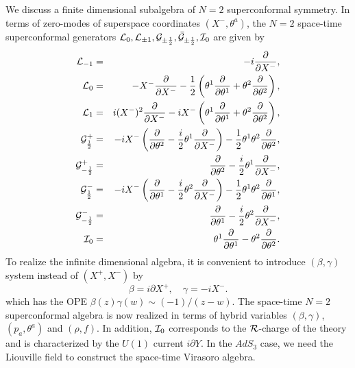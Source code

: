 \documentclass[a4paper,12pt]{article}
\begin{document}
We discuss a finite dimensional subalgebra of $N=2$
superconformal symmetry.
In terms of zero-modes of superspace coordinates $(X^{-},\theta^a)$, the 
$N=2$ space-time superconformal generators 
${\cal L}_{0},{\cal L}_{\pm1},{\cal G}_{\pm{1\over2}},
\bar{\cal G}_{\pm{1\over2}},{\cal I}_{0}$ are given by
\begin{eqnarray}
 {\cal L}_{-1}&=&-i{\partial\over\partial X^{-}},\nonumber\\
{\cal L}_{0}&=&-X^{-}{\partial\over\partial X^{-}}
-{1\over2}\left(\theta^{1}{\partial\over\partial \theta^{1}}+
\theta^{2}{\partial\over\partial \theta^{2}}\right),\nonumber\\
{\cal L}_{1}&=&i(X^{-})^2{\partial\over\partial X^{-}}
-iX^{-}\left(\theta^{1}{\partial\over\partial \theta^{1}}+
\theta^{2}{\partial\over\partial \theta^{2}}\right),\nonumber\\
{\cal G}_{{1\over2}}^{+}&=&
-i X^{-}\left(
{\partial\over\partial \theta^{2}}
-{i\over2}\theta^{1}{\partial\over\partial X^{-}}\right)
-{1\over 2}\theta^{1}\theta^{2}{\partial\over\partial \theta^{2}},
\nonumber\\
{\cal G}_{-{1\over2}}^{+}&=&
{\partial\over\partial \theta^{2}}
-{i\over2}\theta^{1}{\partial\over\partial X^{-}},\nonumber\\
{\cal G}_{{1\over2}}^{-}&=&
-i X^{-}\left(
{\partial\over\partial \theta^{1}}
-{i\over2}\theta^{2}{\partial\over\partial X^{-}}\right)
-{1\over 2}\theta^{1}\theta^{2}{\partial\over\partial \theta^{1}},
\nonumber\\
{\cal G}_{-{1\over2}}^{-}&=&
{\partial\over\partial \theta^{1}}
-{i\over2}\theta^{2}{\partial\over\partial X^{-}},
\nonumber\\
{\cal I}_{0}&=&
\theta^{1}{\partial\over\partial \theta^{1}}-
\theta^{2}{\partial\over\partial \theta^{2}}.
\end{eqnarray}
To realize the infinite dimensional algebra, it is convenient to
introduce $(\beta,\gamma)$ system instead of $(X^{+},X^{-})$ by
\begin{equation}
 \beta=i\partial X^{+},\quad \gamma=-i X^{-}.
\end{equation}
which has the OPE $\beta(z)\gamma(w)\sim (-1)/(z-w)$.
The space-time $N=2$ superconformal algebra is now realized in terms of
hybrid variables $(\beta,\gamma)$, $(p_{a},\theta^{a})$ and $(\rho,f)$.
In addition, ${\cal I}_{0}$ corresponds to the ${\cal R}$-charge of the 
theory and is characterized by the $U(1)$ current $i\partial Y$.
In the $AdS_{3}$ case\cite{GiKuSe}, we need the Liouville field to 
construct the space-time Virasoro algebra.
\end{document}
